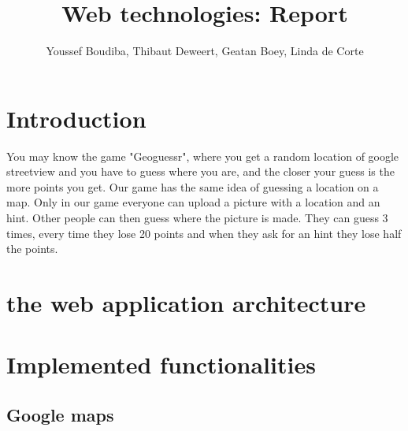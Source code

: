 \documentclass[11pt, oneside]{article}   	%
\title{Web technologies: Report}
\author{Youssef Boudiba, Thibaut Deweert, Geatan Boey, Linda de Corte }
\date{}							%
\begin{document}
\maketitle
\clearpage

\tableofcontents
\clearpage


\section{Introduction}
You may know the game "Geoguessr", where you get a random location of google streetview and you have to guess where you are, and the closer your guess is the more points you get. 
Our game has the same idea of guessing a location on a map. Only in our game everyone can upload a picture with a location and an hint. Other people can then guess where the picture is made. They can guess 3 times, every time they lose 20 points and when they ask for an hint they lose half the points.

\section{ the web application architecture}


\section{Implemented functionalities}


\subsection{Google maps}






 
\end{document}
